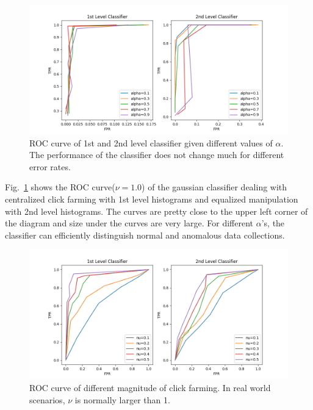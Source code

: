 \documentclass[10pt,conference,letterpaper]{IEEEtran}
\begin{document}
			\begin{figure}[!ht]
				\centering
				\includegraphics[width=\linewidth]{fig/ROC-Alpha.png}
				\caption{ROC curve of 1st and 2nd level classifier given different values of $\alpha$. The performance of the classifier does not change much for different error rates.}
				\label{fig:roc-alpha}
			\end{figure}
	
			Fig.~\ref{fig:roc-alpha} shows the ROC curve($\nu=1.0$) of the gaussian classifier dealing with centralized click farming with 1st level histograms and equalized manipulation with 2nd level histograms. The curves are pretty close to the upper left corner of the diagram and size under the curves are very large. For different $\alpha$'s, the classifier can efficiently distinguish normal and anomalous data collections.
			
			\begin{figure}[!ht]
				\centering
				\includegraphics[width=\linewidth]{fig/ROC-Nu.png}
				\caption{ROC curve of different magnitude of click farming. In real world scenarios, $\nu$ is normally larger than 1.}
				\label{fig:roc-magnitude}
			\end{figure}
	
\end{document}
